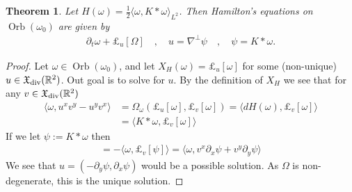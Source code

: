 \documentclass[12pt]{amsart}
\newcommand{\R}{\ensuremath{\mathbb{R}}}
\newtheorem{thm}{Theorem}[section]
\DeclareMathOperator{\Orb}{Orb}
\begin{document}
\begin{thm}
	Let $H(\omega) = \frac{1}{2} \langle \omega , K*\omega \rangle_{L^2}$.  Then Hamilton's equations on $\Orb(\omega_0)$
	are given by
	\begin{align*}
		\partial_t \omega + \pounds_u[\Omega] \quad,\quad u = \nabla^\perp \psi \quad,\quad \psi = K*\omega.
	\end{align*}
\end{thm}
\begin{proof}
  Let $\omega \in \Orb(\omega_0)$, and let $X_H(\omega) = \pounds_u[\omega]$ for some (non-unique) $u \in \mathfrak{X}_{\rm div}(\R^2)$.
  Out goal is to solve for $u$.
  By the definition of $X_H$ we see that for any
  $v \in \mathfrak{X}_{\rm div}(\R^2)$
  \begin{align*}
    \langle \omega , u^x v^y - u^y v^x \rangle &=
    \Omega_{\omega}( \pounds_u[\omega] , \pounds_v[\omega] ) = \langle dH(\omega) , \pounds_v[\omega] \rangle \\
    &= \langle K * \omega , \pounds_v[\omega] \rangle 
  \end{align*}
  If we let $\psi := K*\omega$ then
  \begin{align*}
    = - \langle \omega , \pounds_{v}[\psi] \rangle 
    = \langle \omega , v^x \partial_x \psi + v^y \partial_y \psi \rangle
  \end{align*}
  We see that $u = (-\partial_y \psi,\partial_x \psi)$
  would be a possible solution.
  As $\Omega$ is non-degenerate, this is the unique solution.
\end{proof}
\end{document}
